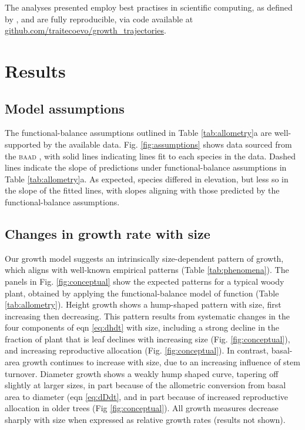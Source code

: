 \documentclass[a4paper,11pt]{article}
\begin{document}
The analyses presented employ best practises in scientific computing, as defined by \citep{Wilson-2014}, and are fully reproducible, via code available at
\href{https://github.com/traitecoevo/growth\_trajectories}{github.com/traitecoevo/growth\_trajectories}.

\section{Results}

\subsection{Model assumptions}

The functional-balance assumptions outlined in Table \ref{tab:allometry}a are well-supported by the available data. Fig. \ref{fig:assumptions} shows data sourced from the \textsc{baad} \citep{Falster-2015b}, with solid lines indicating {\sma} lines fit to each species in the data. Dashed lines indicate the slope of predictions under functional-balance assumptions in Table \ref{tab:allometry}a. As expected, species differed in elevation, but less so in the slope of the fitted lines, with slopes aligning with those predicted by the functional-balance assumptions.

\subsection{Changes in growth rate with size}

Our growth model suggests an intrinsically size-dependent pattern of growth, which aligns with well-known empirical patterns (Table \ref{tab:phenomena}). The panels in Fig. \ref{fig:conceptual} show the expected patterns for a typical woody plant, obtained by applying the functional-balance model of function (Table \ref{tab:allometry}). Height growth shows a hump-shaped pattern with size, first increasing then decreasing. This pattern results from systematic changes in the four components of eqn \ref{eq:dhdt} with size, including a strong decline in the fraction of plant that is leaf declines with increasing size (Fig. \ref{fig:conceptual}), and increasing reproductive allocation (Fig. \ref{fig:conceptual}). In contrast, basal-area growth continues to increase with size, due to an increasing influence of stem turnover. Diameter growth shows a weakly hump shaped curve, tapering off slightly at larger sizes, in part because of the allometric conversion from basal area to diameter (eqn \ref{eq:dDdt}, and in part because of increased reproductive allocation in older trees (Fig \ref{fig:conceptual}). All growth measures decrease sharply with size when expressed as relative growth rates (results not shown).
\end{document}
